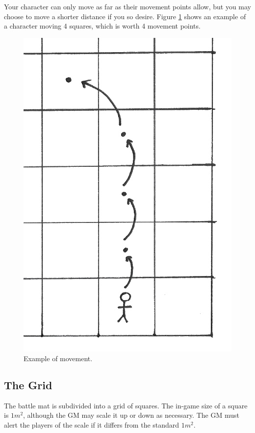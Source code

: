 Your character can only move as far as their movement points allow, but you may choose to move a shorter distance if you so desire.
Figure \ref{fig:movement} shows an example of a character moving 4 squares, which is worth 4 movement points.

\begin{figure}
    \centering
    \includegraphics{graphics/movement-trans.png}
    \caption{Example of movement.}
    \label{fig:movement}
\end{figure}

\subsection{The Grid}
The battle mat is subdivided into a grid of squares. 
The in-game size of a square is $1m^2$, although the GM may scale it up or down as necessary.
The GM must alert the players of the scale if it differs from the standard $1m^2$.

